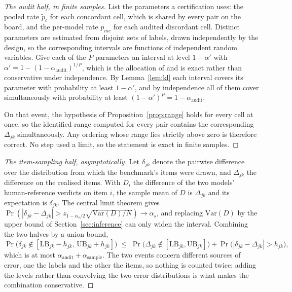 \begin{proof}[The audit half, in finite samples]
List the parameters a certification uses: the pooled rate $\tilde p_c$ for each concordant
cell, which is shared by every pair on the board, and the per-model rate $p_{mc}$ for each
audited discordant cell. Distinct parameters are estimated from disjoint sets of labels,
drawn independently by the design, so the corresponding intervals are functions of independent
random variables. Give each of the $P$ parameters an interval at level
$1 - \alpha'$ with $\alpha' = 1 - (1 - \alpha_{\mathrm{audit}})^{1/P}$, which is the
allocation of \citet{sidak1967rectangular} and is exact rather than conservative under
independence. By Lemma~\ref{lem:kl} each interval covers its parameter with probability at
least $1 - \alpha'$, and by independence all of them cover simultaneously with probability at
least $(1-\alpha')^{P} = 1 - \alpha_{\mathrm{audit}}$.

On that event, the hypothesis of Proposition~\ref{prop:range} holds for every cell at once, so
the identified range computed for every pair contains the corresponding $\Delta_{jk}$
simultaneously. Any ordering whose range lies strictly above zero is therefore correct. No
step used a limit, so the statement is exact in finite samples.
\end{proof}

\begin{proof}[The item-sampling half, asymptotically]
Let $\delta_{jk}$ denote the pairwise difference over the distribution from which the
benchmark's items were drawn, and $\Delta_{jk}$ the difference on the realised items. With
$D_i$ the difference of the two models' human-reference verdicts on item $i$, the sample mean
of $D$ is $\Delta_{jk}$ and its expectation is $\delta_{jk}$. The central limit theorem gives
$\Pr(|\delta_{jk} - \Delta_{jk}| > z_{1-\alpha_s/2}\sqrt{\mathrm{Var}(D)/N}) \to \alpha_s$,
and replacing $\mathrm{Var}(D)$ by the upper bound of Section~\ref{sec:inference} can only
widen the interval. Combining the two halves by a union bound,
\[
\Pr\bigl(\delta_{jk} \notin [\mathrm{LB}_{jk} - h_{jk},\, \mathrm{UB}_{jk} + h_{jk}]\bigr)
\;\le\; \Pr\bigl(\Delta_{jk} \notin [\mathrm{LB}_{jk}, \mathrm{UB}_{jk}]\bigr) + \Pr\bigl(|\delta_{jk} - \Delta_{jk}| > h_{jk}\bigr) ,
\]
which is at most $\alpha_{\mathrm{audit}} + \alpha_{\mathrm{sample}}$. The two events concern
different sources of error, one the labels and the other the items, so nothing is counted
twice; adding the levels rather than convolving the two error distributions is what makes the
combination conservative.
\end{proof}

